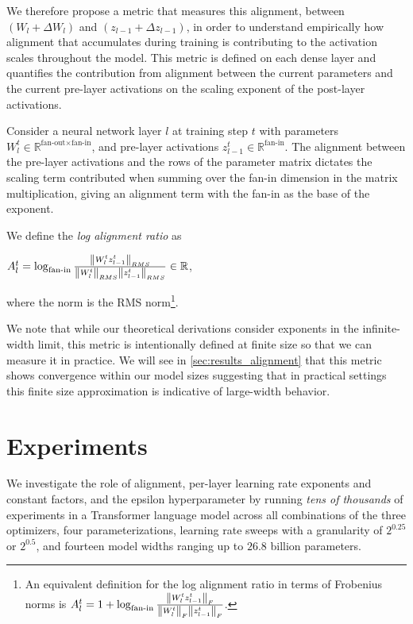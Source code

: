 \documentclass{article}
\newenvironment{tightcenter}{%
  \setlength\topsep{2pt}
  \setlength\parskip{0pt}
  \begin{center}
}{%
  \end{center}
}
\theoremstyle{plain}
\theoremstyle{definition}
\theoremstyle{remark}
\newcommand{\R}{\mathbb{R}}
\begin{document}
 We therefore propose a metric that measures this alignment, between $(W_l + \Delta W_l)$ and $(z_{l-1} + \Delta z_{l-1})$, in order to understand empirically how alignment that accumulates during training is contributing to the activation scales throughout the model. This metric is defined on each dense layer and quantifies the contribution from alignment between the current parameters and the current pre-layer activations on the scaling exponent of the post-layer activations.

Consider a neural network layer $l$ at training step $t$ with parameters $W_l^t \in \R^{\textrm{fan-out} \times \textrm{fan-in}}$, and pre-layer activations $z_{l-1}^t \in \R^{\textrm{fan-in}}$. The alignment between the pre-layer activations and the rows of the parameter matrix dictates the scaling term contributed when summing over the fan-in dimension in the matrix multiplication, giving an alignment term with the fan-in as the base of the exponent.


\begingroup
{} We define the \emph{log alignment ratio} as\begin{tightcenter}$A_l^t = \log_{\textrm{fan-in}} \frac{\norm{ W_l^t z_{l-1}^t}_{RMS}}{\norm{W_{l}^t}_{RMS}\norm{z_{l-1}^t}_{RMS}} \in \mathbb{R}$,\end{tightcenter} where the norm is the RMS norm\footnote{An equivalent definition for the log alignment ratio in terms of Frobenius norms is $A_l^t = 1 + \log_{\textrm{fan-in}} \frac{\norm{ W_l^t z_{l-1}^t}_{F}}{\norm{W_{l}^t}_{F}\norm{z_{l-1}^t}_{F}}$.}.
\endgroup

We note that while our theoretical derivations consider exponents in the infinite-width limit, this metric is intentionally defined at finite size so that we can measure it in practice. We will see in \cref{sec:results_alignment} that this metric shows convergence within our model sizes suggesting that in practical settings this finite size approximation is indicative of large-width behavior.


\section{Experiments}
We investigate the role of alignment, per-layer learning rate exponents and constant factors, and the epsilon hyperparameter by running \emph{tens of thousands} of experiments in a Transformer language model across all combinations of the three optimizers, four parameterizations, learning rate sweeps with a granularity of $2^{0.25}$ or $2^{0.5}$, and fourteen model widths ranging up to $26.8$ billion parameters.
\end{document}

